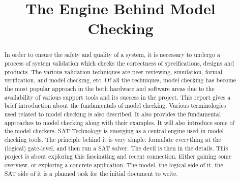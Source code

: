 \documentclass{article}
\begin{document}
\title{The Engine Behind Model Checking}

\maketitle

\begin{abstract}
In order to ensure the safety and quality of a system, it is necessary to undergo a process of system validation which checks the correctness of specifications, designs and products. The various validation techniques are peer reviewing, simulation, formal verification, and model checking, etc. Of all the techniques, model checking has become the most popular approach in the both hardware and software areas due to the availability of various support tools and its success in the project. This report gives a brief introduction about the fundamentals of model checking. Various terminologies used related to model checking is also described. It also provides the fundamental approaches to model checking along with their examples. It will also introduce some of the model checkers. SAT-Technology is emerging as a central engine used in model checking tools. The principle behind it is very simple: formulate everything at the (logical) gate-level, and then run a SAT solver. The devil is then in the details. This project is about exploring this fascinating and recent connection. Either gaining some overview, or exploring a concrete application. The model, the logical side of it, the SAT side of it is a planned task for the initial document to write.

\end{abstract}

\tableofcontents
\end{document}
